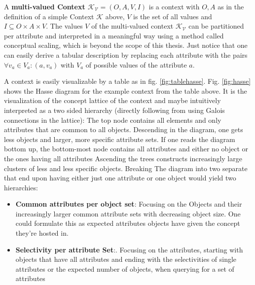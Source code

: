 A \textbf{multi-valued Context $\mathcal{K_V} = (O, A, V, I)$} is a context with $O, A$ as in the definition of a simple Context $\mathcal{K}$ above, $V$ is the set of all values and $I \subseteq O \times A \times V$. The values $V$ of the multi-valued context $\mathcal{K_V}$ can be partitioned per attribute and interpreted in a meaningful way using a method called conceptual scaling, which is beyond the scope of this thesis. Just notice that one can easily derive a tabular description by replacing each attribute with the pairs $\forall v_a \in V_a: (a, v_a)$ with $V_a$ of possible values of the attribute $a$. \\


A context is easily visualizable by a table as in fig. \ref{fig:tablehasse}. Fig. \ref{fig:hasse} shows the Hasse diagram for the example context from the table above. It is the visualization of the concept lattice of the context and maybe intuitively interpreted as a two sided hierarchy (directly following from using Galois connections in the lattice): The top node contains all elements and only attributes that are common to all objects. Descending in the diagram, one gets less objects and larger, more specific attribute sets. If one reads the diagram bottom up, the bottom-most node contains all attributes and either no object or the ones having all attributes Ascending the trees constructs increasingly large clusters of less and less specific objects. Breaking The diagram into two separate that end upon having either just one attribute or one object would yield two hierarchies: 
\begin{itemize}
    \item \textbf{Common attributes per object set}: Focusing on the Objects and their increasingly larger common attribute sets with decreasing object size. One could formulate this as expected attributes objects have given the concept they're hosted in.
    \item \textbf{Selectivity per attribute Set}:. Focusing on the attributes, starting with objects that have all attributes and ending with the selectivities of single attributes or the expected number of objects, when querying for a set of attributes
\end{itemize}

